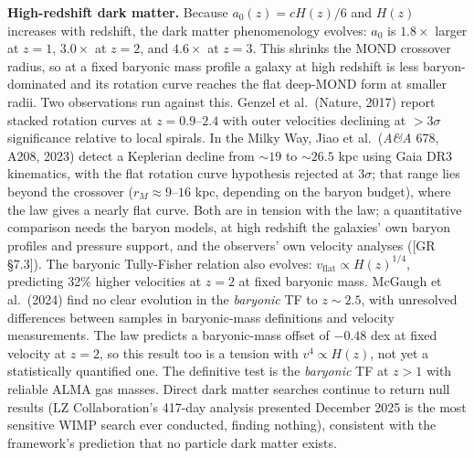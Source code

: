 \documentclass[
]{article}
\begin{document}
\textbf{High-redshift dark matter.} Because \(a_0(z) = cH(z)/6\) and
\(H(z)\) increases with redshift, the dark matter phenomenology evolves:
\(a_0\) is \(1.8\times\) larger at \(z = 1\), \(3.0\times\) at
\(z = 2\), and \(4.6\times\) at \(z = 3\). This shrinks the MOND
crossover radius, so at a fixed baryonic mass profile a galaxy at high
redshift is less baryon-dominated and its rotation curve reaches the
flat deep-MOND form at smaller radii. Two observations run against this.
Genzel et al.~(Nature, 2017) report stacked rotation curves at
\(z = 0.9\)--\(2.4\) with outer velocities declining at \(> 3\sigma\)
significance relative to local spirals. In the Milky Way, Jiao et
al.~(\emph{A\&A} 678, A208, 2023) detect a Keplerian decline from
\(\sim 19\) to \(\sim 26.5\) kpc using Gaia DR3 kinematics, with the
flat rotation curve hypothesis rejected at \(3\sigma\); that range lies
beyond the crossover (\(r_M \approx 9\)--\(16\) kpc, depending on the
baryon budget), where the law gives a nearly flat curve. Both are in
tension with the law; a quantitative comparison needs the baryon models,
at high redshift the galaxies' own baryon profiles and pressure support,
and the observers' own velocity analyses ({[}GR §7.3{]}). The baryonic
Tully-Fisher relation also evolves:
\(v_{\text{flat}} \propto H(z)^{1/4}\), predicting 32\% higher
velocities at \(z = 2\) at fixed baryonic mass. McGaugh et al.~(2024)
find no clear evolution in the \emph{baryonic} TF to \(z \sim 2.5\),
with unresolved differences between samples in baryonic-mass definitions
and velocity measurements. The law predicts a baryonic-mass offset of
\(-0.48\) dex at fixed velocity at \(z = 2\), so this result too is a
tension with \(v^4 \propto H(z)\), not yet a statistically quantified
one. The definitive test is the \emph{baryonic} TF at \(z > 1\) with
reliable ALMA gas masses. Direct dark matter searches continue to return
null results (LZ Collaboration's 417-day analysis presented December
2025 is the most sensitive WIMP search ever conducted, finding nothing),
consistent with the framework's prediction that no particle dark matter
exists.
\end{document}
